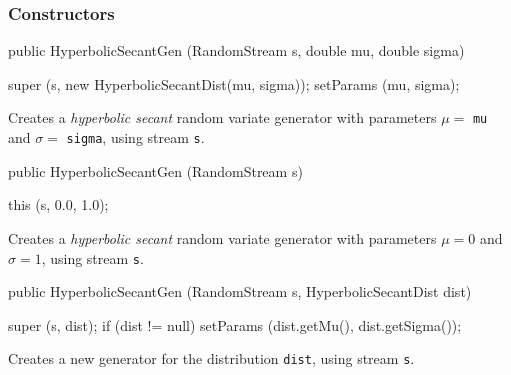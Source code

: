 \subsubsection* {Constructors}
\begin{code}

   public HyperbolicSecantGen (RandomStream s, double mu, double sigma) \begin{hide} {
      super (s, new HyperbolicSecantDist(mu, sigma));
      setParams (mu, sigma);
   }\end{hide}
\end{code} 
\begin{tabb} Creates a {\em hyperbolic secant\/} random variate generator
  with parameters $\mu=$ \texttt{mu} and $\sigma=$ \texttt{sigma},
  using stream \texttt{s}. 
\end{tabb}
\begin{code}

   public HyperbolicSecantGen (RandomStream s) \begin{hide} {
      this (s, 0.0, 1.0);
   }\end{hide}
\end{code} 
\begin{tabb}  Creates a {\em hyperbolic secant\/} random variate generator
  with parameters $\mu=0$ and $\sigma=1$,
  using stream \texttt{s}. 
\end{tabb}
\begin{code}

   public HyperbolicSecantGen (RandomStream s, HyperbolicSecantDist dist) \begin{hide} {
      super (s, dist);
      if (dist != null)
         setParams (dist.getMu(), dist.getSigma());
   }\end{hide}
\end{code}
  \begin{tabb} Creates a new generator for the distribution \texttt{dist},
     using stream \texttt{s}.
  \end{tabb}

